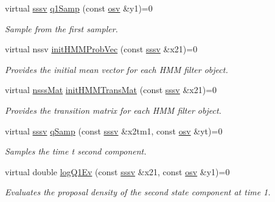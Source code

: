 \begin{DoxyCompactItemize}
virtual \hyperlink{classrbpf__hmm_aa7d73e78fca38e3652890c5c3680dee9}{sssv} \hyperlink{classrbpf__hmm_a56cdb973648c438201da1b46493520ba}{q1\+Samp} (const \hyperlink{classrbpf__hmm_a6ce5868477ec9ad6eaa3b3b23e99e1ae}{osv} \&y1)=0
\begin{DoxyCompactList}\small\item\em Sample from the first sampler. \end{DoxyCompactList}\item 
virtual nssv \hyperlink{classrbpf__hmm_a61f7b50c4370455efe05aed91c3c9a16}{init\+H\+M\+M\+Prob\+Vec} (const \hyperlink{classrbpf__hmm_aa7d73e78fca38e3652890c5c3680dee9}{sssv} \&x21)=0
\begin{DoxyCompactList}\small\item\em Provides the initial mean vector for each H\+MM filter object. \end{DoxyCompactList}\item 
virtual \hyperlink{classrbpf__hmm_a24eee6edeb28e16e01b69c2f7eab4e06}{nsss\+Mat} \hyperlink{classrbpf__hmm_a14cd4883cc2edccd6116a965b0d9c660}{init\+H\+M\+M\+Trans\+Mat} (const \hyperlink{classrbpf__hmm_aa7d73e78fca38e3652890c5c3680dee9}{sssv} \&x21)=0
\begin{DoxyCompactList}\small\item\em Provides the transition matrix for each H\+MM filter object. \end{DoxyCompactList}\item 
virtual \hyperlink{classrbpf__hmm_aa7d73e78fca38e3652890c5c3680dee9}{sssv} \hyperlink{classrbpf__hmm_a58696602bfcdb2e7fd198861ce6c09bf}{q\+Samp} (const \hyperlink{classrbpf__hmm_aa7d73e78fca38e3652890c5c3680dee9}{sssv} \&x2tm1, const \hyperlink{classrbpf__hmm_a6ce5868477ec9ad6eaa3b3b23e99e1ae}{osv} \&yt)=0
\begin{DoxyCompactList}\small\item\em Samples the time t second component. \end{DoxyCompactList}\item 
virtual double \hyperlink{classrbpf__hmm_a6e6087560ff5ab4689889bd74be88787}{log\+Q1\+Ev} (const \hyperlink{classrbpf__hmm_aa7d73e78fca38e3652890c5c3680dee9}{sssv} \&x21, const \hyperlink{classrbpf__hmm_a6ce5868477ec9ad6eaa3b3b23e99e1ae}{osv} \&y1)=0
\begin{DoxyCompactList}\small\item\em Evaluates the proposal density of the second state component at time 1. \end{DoxyCompactList}\item 

\end{DoxyCompactItemize}
